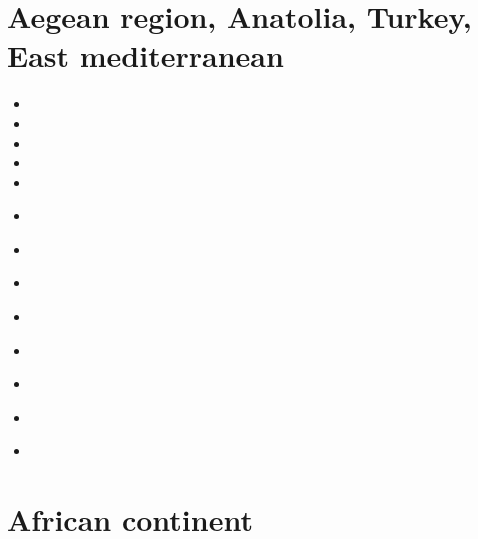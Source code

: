 
\section{Aegean region, Anatolia, Turkey, East mediterranean}

\begin{small}
\begin{itemize}
\item[\nineteenseventyeight] 
\item[\nineteenninetynine] 
\item[\twothousandthree] 
\item[\twothousandten] 
\item[\twothousandeleven] 
\item[\twothousandthirteen] 
\\ 
\item[\twothousandseventeen] 
 \\
\item[\twothousandtwenty] 
 \\
\item[\twothousandtwentyone] 
 \\
\item[\twothousandtwentythree]
\item[\twothousandtwentyfour]
 \\
\item[\twothousandtwentyfive]
\item[2026]
 \\
\textcite{lipg26}
\end{itemize}
\end{small}

\section{African continent}

